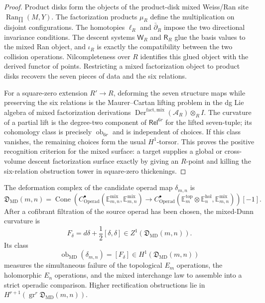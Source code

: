 \begin{proof}
  Product disks form the objects of the product-disk mixed Weiss/Ran
  site \(\operatorname{Ran}_{\prod}(M,Y)\).  The factorization products \(\mu_R\) define the
  multiplication on disjoint configurations.  The homotopies
  \(\ell_R\) and \(\bar\partial_R\) impose the two directional
  invariance conditions.  The descent systems \(\mathsf W_R\) and
  \(\mathsf R_R\) glue the basis values to the mixed Ran object, and
  \(\iota_R\) is exactly the compatibility between the two collision
  operations.  Nilcompleteness over \(R\) identifies this glued object
  with the derived functor of points.  Restricting a mixed
  factorization object to product disks recovers the seven pieces of
  data and the six relations.

  For a square-zero extension \(R'\to R\), deforming the seven
  structure maps while preserving the six relations is the
  Maurer--Cartan lifting problem in the dg Lie algebra of mixed
  factorization derivations
  \(\operatorname{Der}^{\mathrm{fact,mix}}(\mathcal A_R)\otimes_R I\).
  The curvature of a partial lift is the degree-two component of
  \(\mathsf{Rel}^{6r}\) for the lifted seven-tuple; its cohomology class
  is precisely \(\operatorname{ob}_{6r}\) and is independent of choices.
  If this class vanishes, the remaining choices form the usual
  \(H^1\)-torsor.  This proves the positive recognition criterion for the
  mixed surface: a target supplies a global or cross-volume descent
  factorization surface exactly by giving an \(R\)-point and killing the
  six-relation obstruction tower in square-zero thickenings.
\end{proof}

\begin{defn}\label{defn:mixed-dunn-obstruction-complex}
  The deformation complex of the candidate operad map
  \(\delta_{m,n}\) is
  \[
    \mathfrak D_{\mathrm{MD}}(m,n)=
    \operatorname{Cone}\!\left(
      C^\bullet_{\mathrm{Operad}}\!
        (\mathbb E_{m,n}^{\mathrm{mix}},\mathbb E_{m,n}^{\mathrm{mix}})
      \longrightarrow
      C^\bullet_{\mathrm{Operad}}\!
        (\mathbb E_m^{\mathrm{top}}\otimes\mathbb E_n^{\mathrm{hol}},
         \mathbb E_{m,n}^{\mathrm{mix}})
    \right)[-1].
  \]
  After a cofibrant filtration of the source operad has been chosen, the
  mixed-Dunn curvature is
  \[
    F_{\delta}=d\delta+\frac12[\delta,\delta]
      \in Z^1(\mathfrak D_{\mathrm{MD}}(m,n)).
  \]
  Its class
  \[
    \operatorname{ob}_{\mathrm{MD}}(\delta_{m,n})
      =[F_\delta]\in H^1(\mathfrak D_{\mathrm{MD}}(m,n))
  \]
  measures the simultaneous failure of the topological \(E_m\)
  operations, the holomorphic \(E_n\) operations, and the mixed
  interchange law to assemble into a strict operadic comparison.  Higher
  rectification obstructions lie in
  \(H^{r+1}(\operatorname{gr}^r\mathfrak D_{\mathrm{MD}}(m,n))\).
\end{defn}

